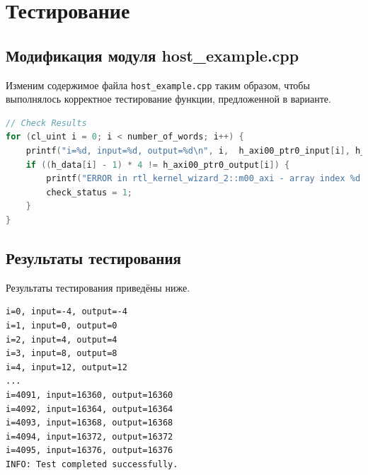 \chapter{Тестирование}

\section{Модификация модуля host\_example.cpp}

Изменим содержимое файла \texttt{host\_example.cpp} таким образом, чтобы
выполнялось корректное тестирование функции, предложенной в варианте.

\lstset{
	frame=single,
	numbers=left
}

\begin{lstlisting}[language=C,caption=Измененный код проверки результата]
// Check Results
for (cl_uint i = 0; i < number_of_words; i++) {
	printf("i=%d, input=%d, output=%d\n", i,  h_axi00_ptr0_input[i], h_axi00_ptr0_output[i]);
	if ((h_data[i] - 1) * 4 != h_axi00_ptr0_output[i]) {
		printf("ERROR in rtl_kernel_wizard_2::m00_axi - array index %d (host addr 0x%03x) - input=%d (0x%x), output=%d (0x%x)\n", i, i*4, h_data[i], h_data[i], h_axi00_ptr0_output[i], h_axi00_ptr0_output[i]);
		check_status = 1;
	}
}
\end{lstlisting}

\section{Результаты тестирования}

Результаты тестирования приведёны ниже.

\lstset{
	numbers=none
}

\begin{lstlisting}
i=0, input=-4, output=-4
i=1, input=0, output=0
i=2, input=4, output=4
i=3, input=8, output=8
i=4, input=12, output=12
...
i=4091, input=16360, output=16360
i=4092, input=16364, output=16364
i=4093, input=16368, output=16368
i=4094, input=16372, output=16372
i=4095, input=16376, output=16376
INFO: Test completed successfully.
\end{lstlisting}
